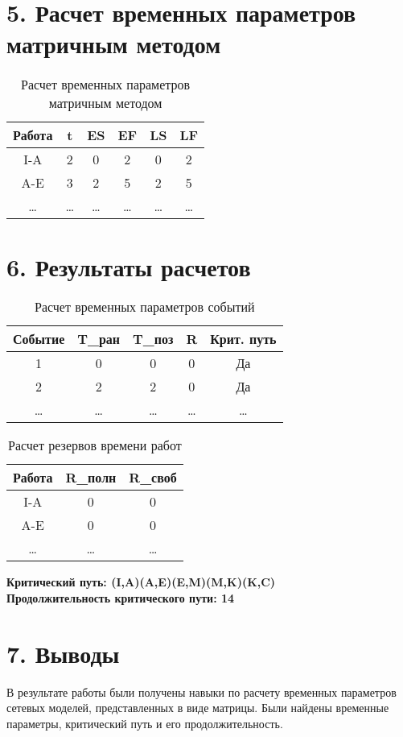 \documentclass[a4paper,12pt]{article}
\begin{document}
\section*{5. Расчет временных параметров матричным методом}
\begin{table}[H]
    \centering
    \begin{tabular}{|c|c|c|c|c|c|}
        \hline
        Работа & t & ES & EF & LS & LF \\
        \hline
        I-A & 2 & 0 & 2 & 0 & 2 \\
        \hline
        A-E & 3 & 2 & 5 & 2 & 5 \\
        \hline
        \ldots & \ldots & \ldots & \ldots & \ldots & \ldots \\
        \hline
    \end{tabular}
    \caption{Расчет временных параметров матричным методом}
\end{table}

\section*{6. Результаты расчетов}
\begin{table}[H]
    \centering
    \begin{tabular}{|c|c|c|c|c|}
        \hline
        Событие & T\_ран & T\_поз & R & Крит. путь \\
        \hline
        1 & 0 & 0 & 0 & Да \\
        \hline
        2 & 2 & 2 & 0 & Да \\
        \hline
        \ldots & \ldots & \ldots & \ldots & \ldots \\
        \hline
    \end{tabular}
    \caption{Расчет временных параметров событий}
\end{table}

\begin{table}[H]
    \centering
    \begin{tabular}{|c|c|c|}
        \hline
        Работа & R\_полн & R\_своб \\
        \hline
        I-A & 0 & 0 \\
        \hline
        A-E & 0 & 0 \\
        \hline
        \ldots & \ldots & \ldots \\
        \hline
    \end{tabular}
    \caption{Расчет резервов времени работ}
\end{table}

\textbf{Критический путь: (I,A)(A,E)(E,M)(M,K)(K,C)} \\
\textbf{Продолжительность критического пути: 14}

\section*{7. Выводы}
В результате работы были получены навыки по расчету временных параметров сетевых моделей, представленных в виде матрицы. Были найдены временные параметры, критический путь и его продолжительность.
\end{document}
